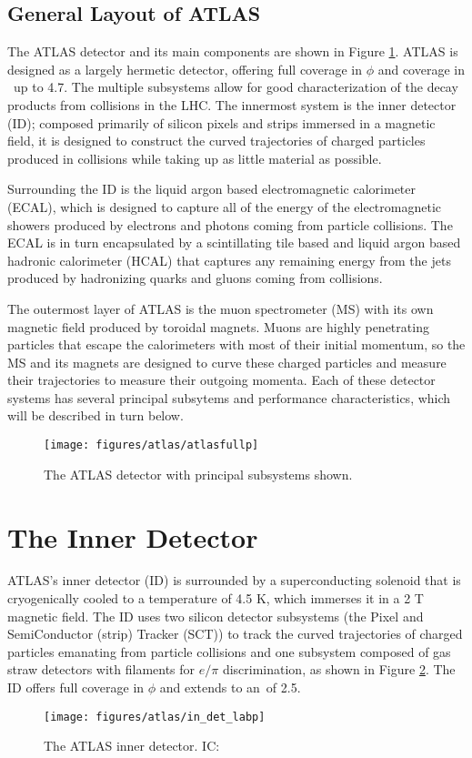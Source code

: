 \subsection{General Layout of ATLAS}
The ATLAS detector and its main components are shown in Figure \ref{fig:atlas}.  ATLAS is designed as a largely hermetic detector, offering full coverage in $\phi$ and coverage in \aeta\, up to 4.7.  The multiple subsystems allow for good characterization of the decay products from collisions in the LHC.  The innermost system is the inner detector (ID); composed primarily of silicon pixels and strips immersed in a magnetic field, it is designed to construct the curved trajectories of charged particles produced in collisions while taking up as little material as possible.

  Surrounding the ID is the liquid argon based electromagnetic calorimeter (ECAL), which is designed to capture all of the energy of the electromagnetic showers produced by electrons and photons coming from particle collisions.  The ECAL is in turn encapsulated by a scintillating tile based and liquid argon based hadronic calorimeter (HCAL) that captures any remaining energy from the jets produced by hadronizing quarks and gluons coming from collisions.

  The outermost layer of ATLAS is the muon spectrometer (MS) with its own magnetic field produced by toroidal magnets.  Muons are highly penetrating particles that escape the calorimeters with most of their initial momentum, so the MS and its magnets are designed to curve these charged particles and measure their trajectories to measure their outgoing momenta.  Each of these detector systems has several principal subsytems and performance characteristics, which will be described in turn below.

\begin{figure}[!htbp]\captionsetup{justification=centering}
  \centering
  \texttt{[image: figures/atlas/atlasfullp]}
  \caption{The ATLAS detector with principal subsystems shown.}
  \label{fig:atlas}
\end{figure}

\section{The Inner Detector}
ATLAS's inner detector (ID) is surrounded by a superconducting solenoid that is cryogenically cooled to a temperature of 4.5 K, which immerses it in a 2 T magnetic field.  The ID uses two silicon detector subsystems (the Pixel and SemiConductor (strip) Tracker (SCT)) to track the curved trajectories of charged particles emanating from particle collisions and one subsystem composed of gas straw detectors with filaments for $e/\pi$ discrimination, as shown in Figure \ref{fig:indet}.  The ID offers full coverage in $\phi$ and extends to an \aeta\,of 2.5.  
\begin{figure}[!htbp]\captionsetup{justification=centering}
  \centering
  \texttt{[image: figures/atlas/in\_det\_labp]}
  \caption{The ATLAS inner detector. IC: \cite{jinstpaper}}
  \label{fig:indet}
\end{figure}

